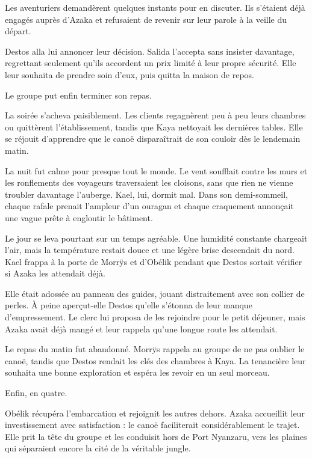 Les aventuriers demandèrent quelques instants pour en discuter. Ils s'étaient déjà engagés auprès d'Azaka et refusaient de revenir sur leur parole à la veille du départ.

Destos alla lui annoncer leur décision. Salida l'accepta sans insister davantage, regrettant seulement qu'ils accordent un prix limité à leur propre sécurité. Elle leur souhaita de prendre soin d'eux, puis quitta la maison de repos.

Le groupe put enfin terminer son repas.

La soirée s'acheva paisiblement. Les clients regagnèrent peu à peu leurs chambres ou quittèrent l'établissement, tandis que Kaya nettoyait les dernières tables. Elle se réjouit d'apprendre que le canoë disparaîtrait de son couloir dès le lendemain matin.

\scenebreak

La nuit fut calme pour presque tout le monde. Le vent soufflait contre les murs et les ronflements des voyageurs traversaient les cloisons, sans que rien ne vienne troubler davantage l'auberge. Kael, lui, dormit mal. Dans son demi-sommeil, chaque rafale prenait l'ampleur d'un ouragan et chaque craquement annonçait une vague prête à engloutir le bâtiment.

Le jour se leva pourtant sur un temps agréable. Une humidité constante chargeait l'air, mais la température restait douce et une légère brise descendait du nord. Kael frappa à la porte de Morrÿs et d'Obélik pendant que Destos sortait vérifier si Azaka les attendait déjà.

Elle était adossée au panneau des guides, jouant distraitement avec son collier de perles. À peine aperçut-elle Destos qu'elle s'étonna de leur manque d'empressement. Le clerc lui proposa de les rejoindre pour le petit déjeuner, mais Azaka avait déjà mangé et leur rappela qu'une longue route les attendait.

Le repas du matin fut abandonné. Morrÿs rappela au groupe de ne pas oublier le canoë, tandis que Destos rendait les clés des chambres à Kaya. La tenancière leur souhaita une bonne exploration et espéra les revoir en un seul morceau.

Enfin, en quatre.

Obélik récupéra l'embarcation et rejoignit les autres dehors. Azaka accueillit leur investissement avec satisfaction : le canoë faciliterait considérablement le trajet. Elle prit la tête du groupe et les conduisit hors de Port Nyanzaru, vers les plaines qui séparaient encore la cité de la véritable jungle.

